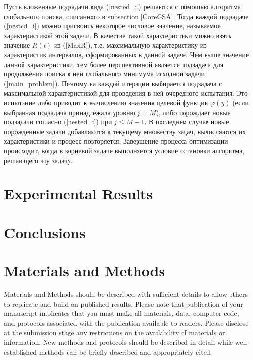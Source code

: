 \documentclass[entropy,article,submit,moreauthors,pdftex]{Definitions/mdpi}
\begin{document}
Пусть вложенные подзадачи вида (\ref{nested_i}) решаются с помощью алгоритма глобального поиска, описанного в subsection \ref{CoreGSA}. Тогда каждой подзадаче (\ref{nested_i}) можно присвоить некоторое числовое значение, называемое характеристикой этой задачи. В качестве такой характеристики можно взять значение $R(t)$ из (\ref{MaxR}), т.е. максимальную характеристику из характеристик интервалов, сформированных в данной задаче. Чем выше значение данной характеристики, тем более перспективной является подзадача для продолжения поиска в ней глобального минимума исходной задачи (\ref{main_problem}). Поэтому на каждой итерации выбирается подзадача с максимальной характеристикой для проведения в ней очередного испытания. Это испытание либо приводит к вычислению значения целевой функции $\varphi(y)$ (если выбранная подзадача принадлежала уровню $j=M$), либо порождает новые подзадачи согласно (\ref{nested_i}) при $j\leq M-1$. В последнем случае новые порожденные задачи добавляются к текущему множеству задач, вычисляются их характеристики и процесс повторяется. Завершение процесса оптимизации происходит, когда в корневой задаче выполняется условие остановки алгоритма, решающего эту задачу.



\section{Experimental Results}



\section{Conclusions}


 
\section{Materials and Methods}

Materials and Methods should be described with sufficient details to allow others to replicate and build on published results. Please note that publication of your manuscript implicates that you must make all materials, data, computer code, and protocols associated with the publication available to readers. Please disclose at the submission stage any restrictions on the availability of materials or information. New methods and protocols should be described in detail while well-established methods can be briefly described and appropriately cited.
\end{document}
